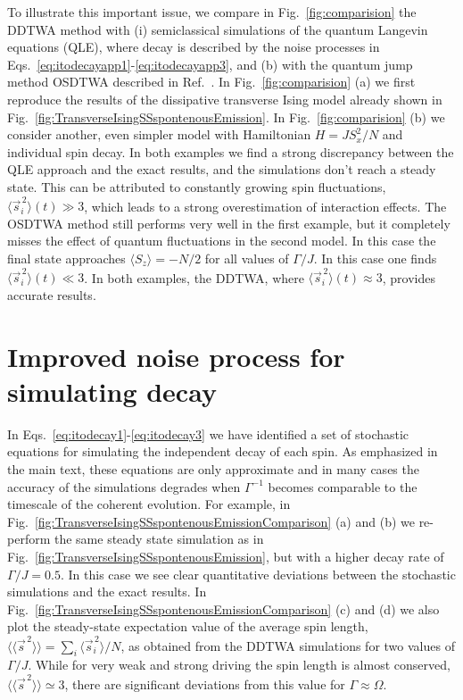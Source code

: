 \documentclass[pra,twocolumn,showpacs,preprintnumbers,amsmath,amssymb,superscriptaddress]{revtex4-1}
\begin{document}
To illustrate this important issue, we compare in Fig.~\ref{fig:comparision}  the DDTWA method with (i) semiclassical simulations of the quantum Langevin equations (QLE), where decay is described by the noise processes in Eqs.~\eqref{eq:itodecayapp1}-\eqref{eq:itodecayapp3}, and (b) with the quantum jump method OSDTWA described in Ref.~\cite{Singh2021}. In Fig.~\ref{fig:comparision} (a) we first reproduce the results of the dissipative transverse Ising model already shown in Fig.~\ref{fig:TransverseIsingSSspontenousEmission}. In Fig.~\ref{fig:comparision} (b) we consider another, even simpler model with Hamiltonian $H= J  S_x^2/N$ and individual spin decay.  In both examples we find a strong discrepancy between the QLE approach and the exact results, and the simulations don't reach a steady state. This can be attributed to constantly growing spin fluctuations, $\langle \vec s_i^{\,2}\rangle(t) \gg 3$, which leads to a strong overestimation of interaction effects. The OSDTWA method still performs very well in the first example, but it completely misses the effect of quantum fluctuations in the second model. In this case the final state approaches $\langle S_z\rangle=-N/2$ for all values of $\Gamma/J$.   In this case one finds $\langle \vec s_i^{\,2}\rangle(t) \ll 3$. In both examples, the DDTWA, where $\langle \vec s_i^{\,2}\rangle(t) \approx 3$, provides accurate results. 




\section{Improved noise process for simulating decay}\label{app:Improved}
In Eqs.~\eqref{eq:itodecay1}-\eqref{eq:itodecay3} we have identified  a set of stochastic equations for simulating the independent decay of each spin. As emphasized in the main text, these equations are only approximate and in many cases the accuracy of the simulations degrades when $\Gamma^{-1}$ becomes comparable to the timescale of the coherent evolution. For example, in Fig.~\ref{fig:TransverseIsingSSspontenousEmissionComparison} (a) and (b) we re-perform the same steady state simulation as in Fig.~\ref{fig:TransverseIsingSSspontenousEmission},  but with a higher decay rate of $\Gamma/J=0.5$. In this case we see clear quantitative deviations between the stochastic simulations and the exact results. In Fig.~\ref{fig:TransverseIsingSSspontenousEmissionComparison} (c) and (d) we also plot the steady-state expectation value of the average spin length, $\langle\langle \vec s^{\,2}\rangle\rangle=\sum_i \langle \vec s_i^{\,2}\rangle/N $, as obtained from the DDTWA simulations for two values of $\Gamma/J$. While for very weak and strong driving the spin length is almost conserved, $\langle\langle \vec s^{\,2}\rangle\rangle\simeq 3$, there are significant deviations from this value for $\Gamma \approx \Omega$. 
\end{document}
